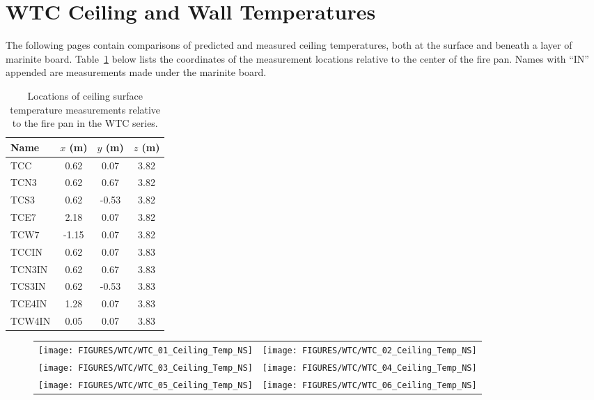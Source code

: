 \clearpage

\section{WTC Ceiling and Wall Temperatures}

The following pages contain comparisons of predicted and measured ceiling temperatures, both at the surface and beneath a layer of
marinite board. Table~\ref{WTC_Ceiling} below lists the coordinates of the measurement locations relative to the center of the fire pan.
Names with ``IN'' appended are measurements made under the marinite board.


\begin{table}[h!]
\caption{Locations of ceiling surface temperature measurements relative to the fire pan in the WTC series.}
\begin{center}
\begin{tabular}{|l|c|c|c|}
\hline
Name                & $x$ (m)   & $y$ (m)   & $z$ (m)   \\ \hline \hline
TCC                 & 0.62      & 0.07      & 3.82      \\ \hline
TCN3                & 0.62      & 0.67      & 3.82      \\ \hline
TCS3                & 0.62      & -0.53     & 3.82      \\ \hline
TCE7                & 2.18      & 0.07      & 3.82      \\ \hline
TCW7                & -1.15     & 0.07      & 3.82      \\ \hline \hline
TCCIN               & 0.62      & 0.07      & 3.83      \\ \hline
TCN3IN              & 0.62      & 0.67      & 3.83      \\ \hline
TCS3IN              & 0.62      & -0.53     & 3.83      \\ \hline
TCE4IN              & 1.28      & 0.07      & 3.83      \\ \hline
TCW4IN              & 0.05      & 0.07      & 3.83      \\ \hline
\end{tabular}
\end{center}
\label{WTC_Ceiling}
\end{table}

\newpage

\begin{figure}[p]
\begin{tabular*}{\textwidth}{l@{\extracolsep{\fill}}r}
\texttt{[image: FIGURES/WTC/WTC\_01\_Ceiling\_Temp\_NS]} &
\texttt{[image: FIGURES/WTC/WTC\_02\_Ceiling\_Temp\_NS]} \\
\texttt{[image: FIGURES/WTC/WTC\_03\_Ceiling\_Temp\_NS]} &
\texttt{[image: FIGURES/WTC/WTC\_04\_Ceiling\_Temp\_NS]} \\
\texttt{[image: FIGURES/WTC/WTC\_05\_Ceiling\_Temp\_NS]} &
\texttt{[image: FIGURES/WTC/WTC\_06\_Ceiling\_Temp\_NS]}
\end{tabular*}
\label{NIST_WTC_Ceiling_NS}
\end{figure}

